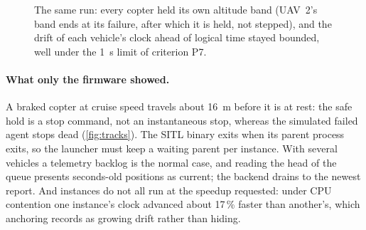 \documentclass[a4paper,11pt]{article}
\begin{document}
\begin{figure}[t]
\centering
{}
\caption{The same run: every copter held its own altitude band (UAV~2's band ends at its
failure, after which it is held, not stepped), and the drift of each vehicle's clock ahead
of logical time stayed bounded, well under the \SI{1}{s} limit of criterion P7.}
\label{fig:bands}
\end{figure}

\paragraph{What only the firmware showed.} A braked copter at cruise speed
travels about \SI{16}{m} before it is at rest: the safe hold is a stop
command, not an instantaneous stop, whereas the simulated failed agent stops
dead (\cref{fig:tracks}). The SITL binary exits when its parent process exits,
so the launcher must keep a waiting parent per instance. With several vehicles
a telemetry backlog is the normal case, and reading the head of the queue
presents seconds-old positions as current; the backend drains to the newest
report. And instances do not all run at the speedup requested: under CPU
contention one instance's clock advanced about 17\,\% faster than another's,
which anchoring records as growing drift rather than hiding.
\end{document}
